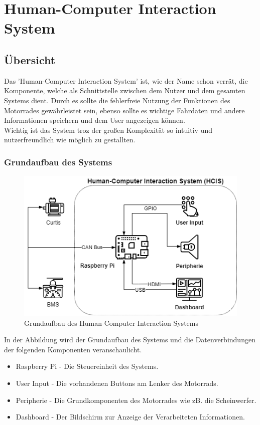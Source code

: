 \chapter{Human-Computer Interaction System}
\section{Übersicht}
Das 'Human-Computer Interaction System' ist, wie der Name schon verrät, die Komponente, welche als Schnittstelle zwischen dem Nutzer und dem gesamten Systems dient. Durch es sollte die fehlerfreie Nutzung der Funktionen des Motorrades gewährleistet sein, ebenso sollte es wichtige Fahrdaten und andere Informationen speichern und dem User angezeigen können.\\ Wichtig ist das System troz der großen Komplexität so intuitiv und nutzerfreundlich wie möglich zu gestallten.

\subsection{Grundaufbau des Systems}

\begin{figure}
	\begin{center}
		\includegraphics[scale=0.5]{figures/hcis/HCIS_Grundfunktion.png}
		\caption{Grundaufbau des Human-Computer Interaction Systems}
	\end{center}
\end{figure}

In der Abbildung wird der Grundaufbau des Systems und die Datenverbindungen der folgenden  Komponenten veranschaulicht.
\begin{itemize}
	\item Raspberry Pi - Die Steuereinheit des Systems.
	\item User Input - Die vorhandenen Buttons am Lenker des Motorrads.
	\item Peripherie - Die Grundkomponenten des Motorrades wie zB. die Scheinwerfer. 
	\item Dashboard - Der Bildschirm zur Anzeige der Verarbeiteten Informationen.
\end{itemize}
